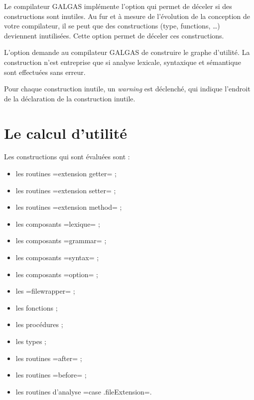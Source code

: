 



Le compilateur GALGAS implémente l'option  qui permet de déceler si des constructions sont inutiles. Au fur et à mesure de l'évolution de la conception de votre compilateur, il se peut que des constructions (type, functions, …) deviennent inutilisées. Cette option permet de déceler ces constructions.

L'option  demande au compilateur GALGAS de construire le graphe d'utilité. La construction n'est entreprise que si analyse lexicale, syntaxique et sémantique sont effectuées sans erreur.

Pour chaque construction inutile, un \emph{warning} est déclenché, qui indique l'endroit de la déclaration de la construction inutile.



\section{Le calcul d'utilité}

Les constructions qui sont évaluées sont :
\begin{itemize}
  \item les routines \ggsq=extension getter= ;
  \item les routines \ggsq=extension setter= ;
  \item les routines \ggsq=extension method= ;
  \item les composants \ggsq=lexique= ;
  \item les composants \ggsq=grammar= ;
  \item les composants \ggsq=syntax= ;
  \item les composants \ggsq=option= ;
  \item les \ggsq=filewrapper= ;
  \item les fonctions ;
  \item les procédures ;
  \item les types ;
  \item les routines \ggsq=after= ;
  \item les routines \ggsq=before= ;
  \item les routines d'analyse \ggsq=case .fileExtension=.
\end{itemize}

